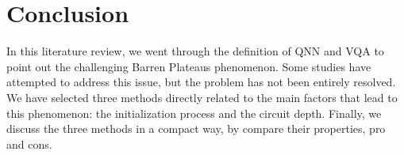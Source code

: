 \section{Conclusion}
In this literature review, we went through the definition of QNN and VQA to point out the challenging Barren Plateaus phenomenon. 
Some studies have attempted to address this issue, but the problem has not been entirely resolved.
We have selected three methods directly related to the main factors that lead to this phenomenon: the initialization process and the circuit depth.
Finally, we discuss the three methods in a compact way, by compare their properties, pro and cons.
